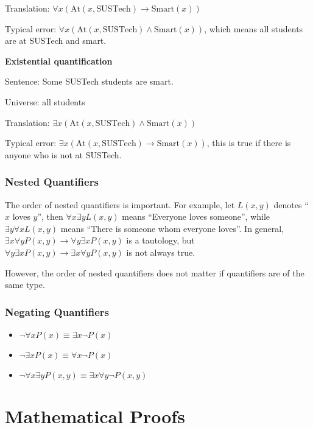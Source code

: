 \documentclass[a4paper,12pt]{article}
\begin{document}
\qquad Translation: $\forall x (\text{At}(x, \text{SUSTech}) \rightarrow \text{Smart}(x))$

\qquad Typical error: $\forall x (\text{At}(x, \text{SUSTech}) \wedge \text{Smart}(x))$, which means all students are at SUSTech and smart.

\textbf{Existential quantification}

\qquad Sentence: Some SUSTech students are smart.

\qquad Universe: all students

\qquad Translation: $\exists x (\text{At}(x, \text{SUSTech}) \wedge \text{Smart}(x))$

\qquad Typical error: $\exists x (\text{At}(x, \text{SUSTech}) \rightarrow \text{Smart}(x))$, this is true if there is anyone who is not at SUSTech.

\subsubsection{Nested Quantifiers}

The order of nested quantifiers is important.
For example, let $L(x,y)$ denotes ``$x$ loves $y$'', then $\forall x \exists y L(x,y)$ means ``Everyone loves someone'', while $\exists y \forall x L(x,y)$ means ``There is someone whom everyone loves''.
In general, $\exists x \forall y P(x,y) \rightarrow \forall y \exists x P(x,y)$ is a tautology, but $\forall y \exists x P(x,y) \rightarrow \exists x \forall y P(x,y)$ is not always true.

However, the order of nested quantifiers does not matter if quantifiers are of the same type.

\subsubsection{Negating Quantifiers}

\begin{itemize}
	\item $\neg \forall x P(x) \equiv \exists x \neg P(x)$
	\item $\neg \exists x P(x) \equiv \forall x \neg P(x)$
	\item $\neg \forall x \exists y P(x,y) \equiv \exists x \forall y \neg P(x,y)$
\end{itemize}

\section{Mathematical Proofs}
\end{document}
